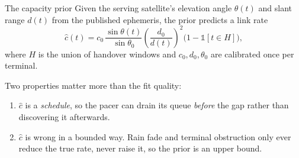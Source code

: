 \documentclass[aspectratio=169,10pt]{beamer}
\begin{document}
\begin{frame}{The capacity prior}
  Given the serving satellite's elevation angle $\theta(t)$ and slant range $d(t)$ from the
  published ephemeris, the prior predicts a link rate
  \begin{equation}
    \label{eq:prior}
    \hat{c}(t) = c_{0}\,\frac{\sin \theta(t)}{\sin \theta_{0}}
                 \left(\frac{d_{0}}{d(t)}\right)^{2}
                 \bigl(1 - \mathbb{1}[t \in H]\bigr),
  \end{equation}
  where $H$ is the union of handover windows and $c_0, d_0, \theta_0$ are calibrated once per terminal.

  \pause
  \vspace{0.6em}
  Two properties matter more than the fit quality:
  \begin{enumerate}
    \item<2-> $\hat{c}$ is a \emph{schedule}, so the pacer can drain its queue \emph{before} the gap
      rather than discovering it afterwards.
    \item<3-> $\hat{c}$ is wrong in a bounded way. Rain fade and terminal obstruction only ever
      reduce the true rate, never raise it, so the prior is an upper bound.
  \end{enumerate}
\end{frame}
\end{document}
